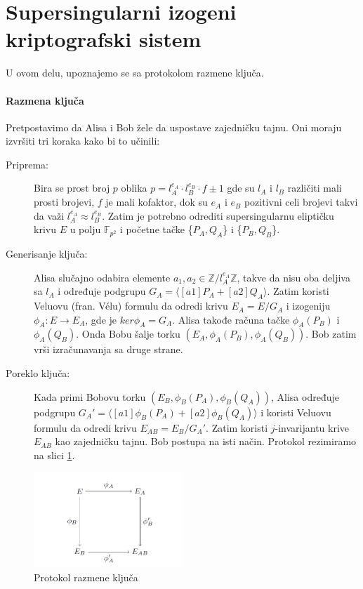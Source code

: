 \documentclass[a4paper]{article}
\begin{document}
\section{Supersingularni izogeni kriptografski sistem}
\label{sec: razmena kljuca}

\noindent U ovom delu, upoznajemo se sa protokolom razmene ključa.

\paragraph{Razmena ključa} Pretpostavimo da Alisa i Bob žele da uspostave zajedničku tajnu. Oni moraju izvršiti tri koraka kako bi to učinili:

\begin{description}
	\item[Priprema:] Bira se prost broj $p$ oblika $p = l^{e_A}_{A} \cdot l^{e_B}_{B} \cdot f \pm 1$ gde su $l_{A}$ i  $l_{B}$ različiti mali prosti brojevi, $f$ je mali kofaktor, dok su $e_A$ i $e_B$ pozitivni celi brojevi takvi da važi $l^{e_A}_{A} \approx l^{e_B}_{B}$. Zatim je potrebno odrediti supersingularnu eliptičku krivu $E$ u polju $\mathbb{F}_{p^2}$ i početne tačke \{$P_A, Q_A$\} i \{$P_B, Q_B$\}. 
	
	
	\item[Generisanje ključa:] Alisa slučajno odabira elemente $a_1, a_2 \in \mathbb{Z}/l^{e_A}_{A}\mathbb{Z}$, takve da nisu oba deljiva sa $l_A$ i određuje podgrupu $G_A = \langle [a1]P_A + [a2]Q_A \rangle $. Zatim koristi Veluovu (fran. V\' elu) \cite{velu} formulu da odredi krivu $E_A = E/G_A$ i izogeniju $\phi_A: E \longrightarrow E_A$, gde je $ker \phi_A = G_A$. Alisa takođe računa tačke $\phi_A(P_B)$ i $\phi_A(Q_B)$. Onda Bobu šalje torku $(E_A, \phi_A(P_B), \phi_A(Q_B))$. Bob zatim vrši izračunavanja sa druge strane.
	
	\item[Poreklo ključa:] Kada primi Bobovu torku $(E_B, \phi_B(P_A), \phi_B(Q_A))$, Alisa određuje podgrupu $G_A' = \langle [a1]\phi_B(P_A) + [a2]\phi_B(Q_A) \rangle$ i koristi Veluovu formulu da odredi krivu $E_{AB} = E_B / G_A'$. Zatim koristi $j$-invarijantu krive $E_{AB}$ kao zajedničku tajnu. Bob postupa na isti način. Protokol rezimiramo na slici \ref{fig: razmena kljuca}.
	
\end{description}


\begin{figure}[h]
	\centering
	\includegraphics[width=0.5\textwidth]{razmena_kljuca.png}
	\caption{Protokol razmene ključa}
	\label{fig: razmena kljuca}
\end{figure}
\end{document}
